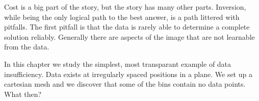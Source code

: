 \par
Cost is a big part of the story, but the story has many other parts.
Inversion, while being the only logical path to the best answer,
is a path littered with pitfalls.
The first pitfall is that the data is rarely able to 
determine a complete solution reliably.
Generally there are aspects of the image that are not learnable
from the data.

\par
In this chapter we study the simplest, most transparant example
of data insufficiency.
Data exists at irregularly spaced positions in a plane.
We set up a cartesian mesh and we discover that some
of the bins contain no data points.
What then?


